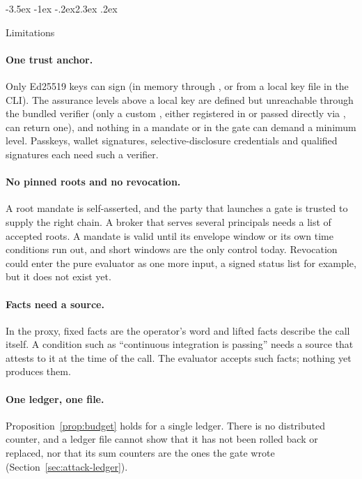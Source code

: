 \documentclass[10pt,twocolumn]{article}
\makeatletter
\theoremstyle{plain}
\theoremstyle{definition}
\renewcommand\section{\@startsection{section}{1}{\z@}%
  {-3.5ex \@plus -1ex \@minus -.2ex}{2.3ex \@plus .2ex}%
  {\normalfont\Large\bfseries\raggedright}}
\makeatother
\begin{document}
\section{Limitations}
\label{sec:limits}

\paragraph{One trust anchor.}
Only Ed25519 keys can sign (in memory through , or from a local key file in the CLI). The assurance levels above a local key are defined but unreachable through the bundled verifier (only a custom , either registered in  or passed directly via , can return one), and nothing in a mandate or in the gate can demand a minimum level. Passkeys, wallet signatures, selective-disclosure credentials and qualified signatures each need such a verifier.

\paragraph{No pinned roots and no revocation.}
A root mandate is self-asserted, and the party that launches a gate is trusted to supply the right chain. A broker that serves several principals needs a list of accepted roots. A mandate is valid until its envelope window or its own time conditions run out, and short windows are the only control today. Revocation could enter the pure evaluator as one more input, a signed status list for example, but it does not exist yet.

\paragraph{Facts need a source.}
In the proxy, fixed facts are the operator's word and lifted facts describe the call itself. A condition such as ``continuous integration is passing'' needs a source that attests to it at the time of the call. The evaluator accepts such facts; nothing yet produces them.

\paragraph{One ledger, one file.}
Proposition~\ref{prop:budget} holds for a single ledger. There is no distributed counter, and a ledger file cannot show that it has not been rolled back or replaced, nor that its sum counters are the ones the gate wrote (Section~\ref{sec:attack-ledger}).
\end{document}
